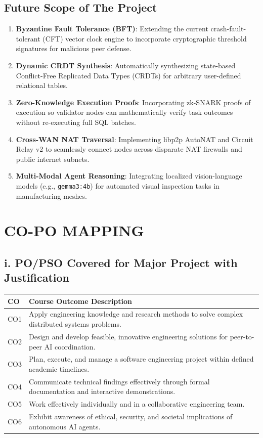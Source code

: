 \documentclass[12pt,a4paper]{report}
\begin{document}
\section{Future Scope of The Project}
\begin{enumerate}[label=\roman*.,leftmargin=*,itemsep=3pt]
    \item \textbf{Byzantine Fault Tolerance (BFT)}: Extending the current crash-fault-tolerant (CFT) vector clock engine to incorporate cryptographic threshold signatures for malicious peer defense.
    \item \textbf{Dynamic CRDT Synthesis}: Automatically synthesizing state-based Conflict-Free Replicated Data Types (CRDTs) for arbitrary user-defined relational tables.
    \item \textbf{Zero-Knowledge Execution Proofs}: Incorporating zk-SNARK proofs of execution so validator nodes can mathematically verify task outcomes without re-executing full SQL batches.
    \item \textbf{Cross-WAN NAT Traversal}: Implementing libp2p AutoNAT and Circuit Relay v2 to seamlessly connect nodes across disparate NAT firewalls and public internet subnets.
    \item \textbf{Multi-Modal Agent Reasoning}: Integrating localized vision-language models (e.g., \texttt{gemma3:4b}) for automated visual inspection tasks in manufacturing meshes.
\end{enumerate}

\chapter*{CO-PO MAPPING}

\section*{i. PO/PSO Covered for Major Project with Justification}
\begin{tabularx}{\textwidth}{|l|X|}
\hline
\textbf{CO} & \textbf{Course Outcome Description} \\
\hline
CO1 & Apply engineering knowledge and research methods to solve complex distributed systems problems. \\
CO2 & Design and develop feasible, innovative engineering solutions for peer-to-peer AI coordination. \\
CO3 & Plan, execute, and manage a software engineering project within defined academic timelines. \\
CO4 & Communicate technical findings effectively through formal documentation and interactive demonstrations. \\
CO5 & Work effectively individually and in a collaborative engineering team. \\
CO6 & Exhibit awareness of ethical, security, and societal implications of autonomous AI agents. \\
\hline
\end{tabularx}
\end{document}
